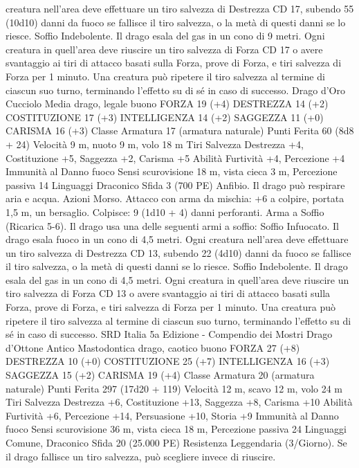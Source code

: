 \begin{multicols}{2}
creatura nell’area deve effettuare un tiro salvezza di Destrezza CD
17, subendo 55 (10d10) danni da fuoco se fallisce il tiro salvezza, o
la metà di questi danni se lo riesce.
Soffio Indebolente. Il drago esala del gas in un cono di 9 metri. Ogni
creatura in quell’area deve riuscire un tiro salvezza di Forza CD 17 o
avere svantaggio ai tiri di attacco basati sulla Forza, prove di Forza, e
tiri salvezza di Forza per 1 minuto. Una creatura può ripetere il tiro
salvezza al termine di ciascun suo turno, terminando l’effetto su di sé
in caso di successo.
Drago d’Oro Cucciolo
Media drago, legale buono
FORZA 19 (+4)
DESTREZZA 14 (+2)
COSTITUZIONE 17 (+3)
INTELLIGENZA 14 (+2)
SAGGEZZA 11 (+0)
CARISMA 16 (+3)
Classe Armatura 17 (armatura naturale)
Punti Ferita 60 (8d8 + 24)
Velocità 9 m, nuoto 9 m, volo 18 m
Tiri Salvezza Destrezza +4, Costituzione +5, Saggezza +2,
Carisma +5
Abilità Furtività +4, Percezione +4
Immunità al Danno fuoco
Sensi scurovisione 18 m, vista cieca 3 m, Percezione passiva 14
Linguaggi Draconico
Sfida 3 (700 PE)
Anfibio. Il drago può respirare aria e acqua.
Azioni
Morso. Attacco con arma da mischia: +6 a colpire, portata 1,5
m, un bersaglio.
Colpisce: 9 (1d10 + 4) danni perforanti.
Arma a Soffio (Ricarica 5-6). Il drago usa una delle seguenti armi
a soffio:
Soffio Infuocato. Il drago esala fuoco in un cono di 4,5 metri. Ogni
creatura nell’area deve effettuare un tiro salvezza di Destrezza CD
13, subendo 22 (4d10) danni da fuoco se fallisce il tiro salvezza, o la
metà di questi danni se lo riesce.
Soffio Indebolente. Il drago esala del gas in un cono di 4,5 metri.
Ogni creatura in quell’area deve riuscire un tiro salvezza di Forza CD
13 o avere svantaggio ai tiri di attacco basati sulla Forza, prove di
Forza, e tiri salvezza di Forza per 1 minuto. Una creatura può ripetere
il tiro salvezza al termine di ciascun suo turno, terminando l’effetto
su di sé in caso di successo.
SRD Italia 5a Edizione - Compendio dei Mostri
Drago d’Ottone Antico
Mastodontica drago, caotico buono
FORZA 27 (+8)
DESTREZZA 10 (+0)
COSTITUZIONE 25 (+7)
INTELLIGENZA 16 (+3)
SAGGEZZA 15 (+2)
CARISMA 19 (+4)
Classe Armatura 20 (armatura naturale)
Punti Ferita 297 (17d20 + 119)
Velocità 12 m, scavo 12 m, volo 24 m
Tiri Salvezza Destrezza +6, Costituzione +13, Saggezza +8,
Carisma +10
Abilità Furtività +6, Percezione +14, Persuasione +10, Storia +9
Immunità al Danno fuoco
Sensi scurovisione 36 m, vista cieca 18 m, Percezione passiva 24
Linguaggi Comune, Draconico
Sfida 20 (25.000 PE)
Resistenza Leggendaria (3/Giorno). Se il drago fallisce un tiro
salvezza, può scegliere invece di riuscire.

\end{multicols}
